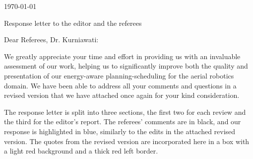 \documentclass[10pt]{letter}
\newcommand{\yesterday}{{\AdvanceDate[-1]\today}}
\begin{document}
\pagestyle{plain}
\selectfont




\begin{flushright}%
  \yesterday\end{flushright}

\vspace{2em}


{\centering Response letter to the editor and the referees}

\vspace{5em}

Dear Referees, Dr. Kurniawati:

\vspace{1em}

We greatly appreciate your time and effort in providing us with an invaluable assessment of our work, helping us to significantly improve both the quality and presentation of our energy-aware planning-scheduling for the aerial robotics domain. We have been able to address all your comments and questions in a revised version that we have attached once again for your kind consideration. 

The response letter is split into three sections, the first two for each review and the third for the editor's report. The referees' comments are in black, and our response is highlighted in blue, similarly to the edits in the attached revised version. The quotes from the revised version are incorporated here in a box with a light red background and a thick red left border.
\end{document}
